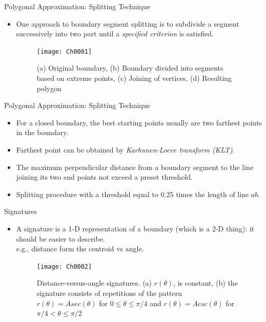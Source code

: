 \begin{frame}{Polygonal Approximation: Splitting Technique}
\begin{itemize}
\item One approach to boundary segment splitting is 
to subdivide a segment successively into two 
part until a \textit{\color{mycolor1}specified criterion} is satisfied.
\begin{figure}
\texttt{[image: Ch0001]}
\caption{(a) Original boundary, (b) Boundary divided into segments based on extreme points, (c) Joining of vertices, (d) Resulting polygon}
\end{figure}
\end{itemize}
\end{frame}

\begin{frame}{Polygonal Approximation: Splitting Technique}
\begin{itemize}
\item For a closed boundary, the best starting points 
usually are two farthest points in the boundary.
\item Farthest point can be obtained by \textit{\color{mycolor1}Karhunen-Loeve transform (KLT)}.
\item The maximum perpendicular distance from a boundary segment to the line joining its two end points not exceed a preset threshold.
\item Splitting procedure with a threshold equal to 
0.25 times the length of line $ab$.
\end{itemize}
\end{frame}

\begin{frame}{Signatures}
\begin{itemize}
\item A signature is a 1-D representation of a boundary (which is a 2-D thing): it should be easier to describe.\\ e.g., distance form the centroid vs angle.
\begin{figure}
\texttt{[image: Ch0002]}
\caption{Distance-versus-angle signatures. (a) $r(\theta)$, is constant, (b) the signature consists of repetitions of the pattern $r(\theta)=Asec(\theta)$ for $0\leq \theta \leq \pi/4$ and $r(\theta)=Acsc(\theta)$ for $\pi/4<\theta\leq \pi/2$}
\end{figure}
\end{itemize}
\end{frame}

